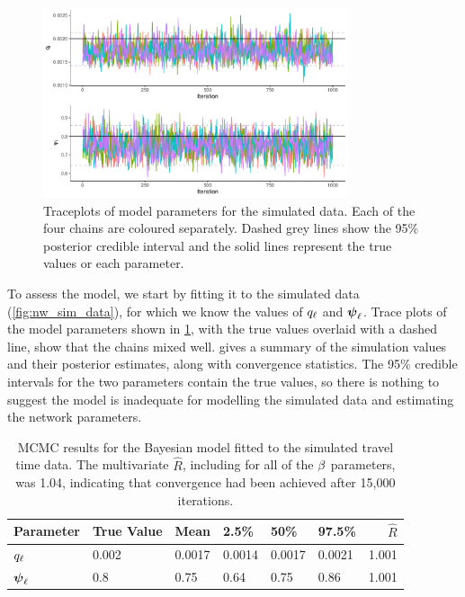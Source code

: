 \begin{knitrout}\small
{}\color{fgcolor}\begin{figure}

{\centering \includegraphics[width=0.8\textwidth]{figure/nw_model_sim_results-1} 

}

\caption[Traceplots of model parameters for the simulated data]{Traceplots of model parameters for the simulated data. Each of the four chains are coloured separately. Dashed grey lines show the 95\% posterior credible interval and the solid lines represent the true values or each parameter.}\label{fig:nw_model_sim_results}
\end{figure}


\end{knitrout}


To assess the model, we start by fitting it to the simulated data (\cref{fig:nw_sim_data}), for which we know the values of $q_\ell$ and $\mathbf{\boldsymbol{\psi}}_\ell$. Trace plots of the model parameters shown in \cref{fig:nw_model_sim_results}, with the true values overlaid with a dashed line, show that the chains mixed well.  gives a summary of the simulation values and their posterior estimates, along with convergence statistics. The 95\% credible intervals for the two parameters contain the true values, so there is nothing to suggest the model is inadequate for modelling the simulated data and estimating the network parameters.


\begin{table}

\caption[MCMC results for the Bayesian model fitted to the simulated travel time data]{\label{tab:nw_model_sim_smry}MCMC results for the Bayesian model fitted to the simulated travel time data. The multivariate $\hat R$, including for all of the $\beta$ parameters, was 1.04, indicating that convergence had been achieved after 15,000 iterations.}
\centering
\begin{tabular}[b]{llllllr}
\toprule
Parameter & True Value & Mean & 2.5\% & 50\% & 97.5\% & $\hat R$\\
\midrule
$q_\ell$ & 0.002 & 0.0017 & 0.0014 & 0.0017 & 0.0021 & 1.001\\
$\mathbf{\boldsymbol{\psi}}_\ell$ & 0.8 & 0.75 & 0.64 & 0.75 & 0.86 & 1.001\\
\bottomrule
\end{tabular}
\end{table}





